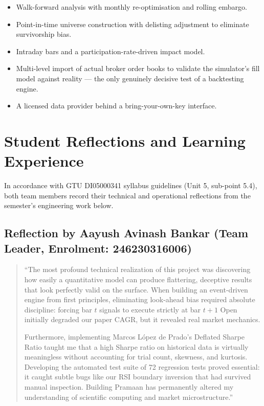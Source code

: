 \documentclass[12pt,a4paper,oneside]{report}
\begin{document}
\begin{itemize}[leftmargin=1.5cm]
    \item Walk-forward analysis with monthly re-optimisation and rolling
    embargo.
    \item Point-in-time universe construction with delisting adjustment to
    eliminate survivorship bias.
    \item Intraday bars and a participation-rate-driven impact model.
    \item Multi-level import of actual broker order books to validate the
    simulator's fill model against reality --- the only genuinely decisive test
    of a backtesting engine.
    \item A licensed data provider behind a bring-your-own-key interface.
\end{itemize}

\section{Student Reflections and Learning Experience}\label{sec:reflections}

In accordance with GTU DI05000341 syllabus guidelines (Unit 5, sub-point 5.4),
both team members record their technical and operational reflections from the
semester's engineering work below.

\subsection{Reflection by Aayush Avinash Bankar (Team Leader, Enrolment\hspace{0pt}: 246230316006)}
\begin{quote}
``The most profound technical realization of this project was discovering how easily
a quantitative model can produce flattering, deceptive results that look perfectly
valid on the surface. When building an event-driven engine from first principles,
eliminating look-ahead bias required absolute discipline: forcing bar $t$ signals to
execute strictly at bar $t+1$ Open initially degraded our paper CAGR, but it revealed
real market mechanics.

Furthermore, implementing Marcos L\'opez de Prado's Deflated Sharpe Ratio taught me
that a high Sharpe ratio on historical data is virtually meaningless without
accounting for trial count, skewness, and kurtosis. Developing the automated test
suite of 72 regression tests proved essential: it caught subtle bugs like our RSI
boundary inversion that had survived manual inspection. Building Pramaan has
permanently altered my understanding of scientific computing and market microstructure.''
\end{quote}
\end{document}
